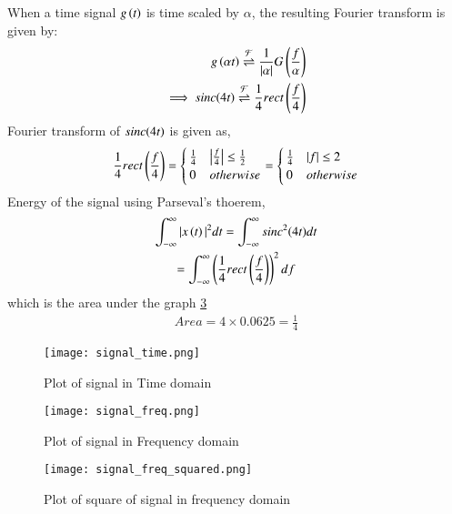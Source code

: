 \documentclass[journal,12pt,twocolumn]{IEEEtran}
\begin{document}
When a time signal $g\left(t\right)$ is time scaled by $\alpha$, the resulting Fourier transform is given by:
\begin{align}
    g\left(\alpha t\right) \overset{\mathcal{F}}{ \rightleftharpoons} \frac{1}{\vert\alpha\vert}G\left(\frac{f}{\alpha}\right)
    \label{scale} \\
    \implies sinc{\left(4t\right)} \overset{\mathcal{F}}{ \rightleftharpoons} \frac{1}{4}rect\left(\frac{f}{4}\right)
\end{align}
Fourier transform of $sinc{\left(4t\right)}$ is given as,
\begin{align}
    \frac{1}{4}rect\left(\frac{f}{4}\right) = 
    \begin{cases}
    \frac{1}{4} & \big{|}\frac{f}{4}\big{|}\leq  \frac{1}{2}\\
    0 & otherwise
    \end{cases}
     = 
    \begin{cases}
    \frac{1}{4} & |f| \leq  2\\
    0 & otherwise
     \end{cases}
\end{align}
Energy of the signal using Parseval's thoerem,
\begin{multline}
    \int_{-\infty}^{\infty} |x\left(t\right)|^{2} dt = \int_{-\infty}^{\infty} sinc^2{\left(4t\right)}  dt \\= \int_{-\infty}^{\infty} \left(\frac{1}{4}rect\left(\frac{f}{4}\right)\right)^2  df
\end{multline}
which is the area under the graph \ref{fig:rect_squared}
\begin{align}
    Area = 4 \times 0.0625 = \frac{1}{4}
\end{align}
\begin{figure}[h!]
\centering
\texttt{[image: signal\_time.png]}
\caption{Plot of signal in Time domain}
\label{fig:sig_time}
\end{figure}
\begin{figure}[h!]
\centering
\texttt{[image: signal\_freq.png]}
\caption{Plot of signal in Frequency domain}
\label{fig:sig_freq}
\end{figure}
\begin{figure}[h!]
\centering
\texttt{[image: signal\_freq\_squared.png]}
\caption{Plot of square of signal in frequency domain}
\label{fig:rect_squared}
\end{figure}
\end{document}
